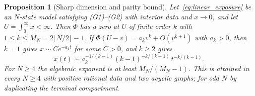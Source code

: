 \documentclass[11pt,a4paper]{article}
\newtheorem{proposition}[theorem]{Proposition}
\theoremstyle{definition}\newtheorem{definition}[theorem]{Definition}
\theoremstyle{remark}\newtheorem{remark}[theorem]{Remark}
\begin{document}
\begin{proposition}[Sharp dimension and parity bound]
\label{prop:dimension}
Let~\eqref{eq:linear_exposure} be an $N$-state model satisfying
(G1)--(G2) with interior data and $x\to0$, and let $U=\int_0^\infty x<\infty$.
Then $\Phi$ has a zero at $U$ of finite order $k$ with
$1\le k\le M_N=2\lfloor N/2\rfloor-1$. If $\Phi(U-v)=a_kv^k+O(v^{k+1})$
with $a_k>0$, then $k=1$ gives $x\sim Ce^{-a_1t}$ for some $C>0$, and
$k\ge2$ gives
\begin{equation}
x(t)\sim a_k^{-1/(k-1)}(k-1)^{-k/(k-1)}\,t^{-k/(k-1)}.
\label{eq:multiplicitytail}
\end{equation}
For $N\ge4$ the algebraic exponent is at least $M_N/(M_N-1)$. This is
attained in every $N\ge4$ with positive rational data and two acyclic
graphs; for odd $N$ by duplicating the terminal compartment.
\end{proposition}
\end{document}
